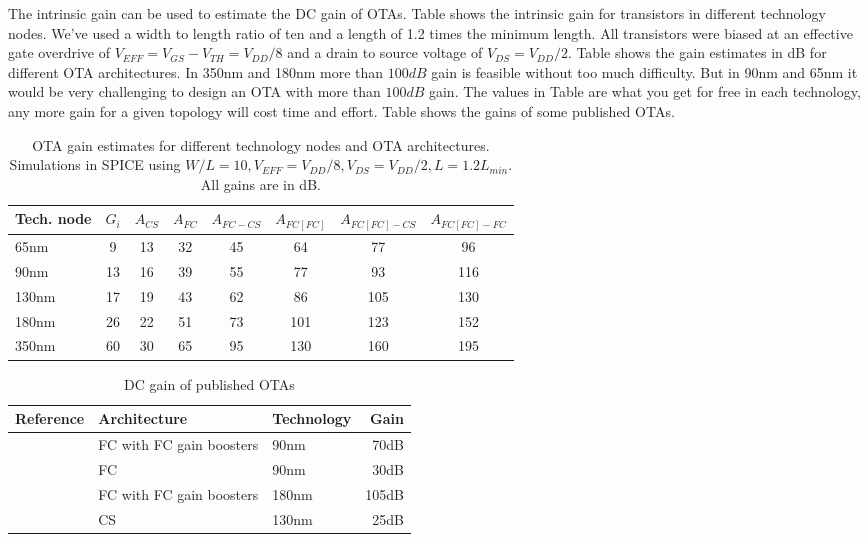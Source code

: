 The intrinsic gain can be used to estimate the DC gain of
OTAs. Table \label{tab:ingain} shows the intrinsic gain for
transistors in different technology nodes. We've used a width to
length ratio of ten and a length of 1.2 times the minimum length. All
transistors were biased at an effective gate overdrive of $V_{EFF} = V_{GS} - V_{TH} =
V_{DD}/8$ and a drain to source voltage of $V_{DS} =
V_{DD}/2$. Table \label{tab:ingain} shows the gain estimates in dB for different
OTA architectures. In 350nm and 180nm  more than $100dB$ gain is feasible without
too much difficulty. But in 90nm and 65nm it would be very challenging
to design an OTA with more than $100dB$ gain. The
values in Table \label{tab:ingain} are what you get for free in each
technology, any more gain for a given topology will cost time and
effort. Table \label{tab:realota} shows the gains of
some published OTAs.

\begin{table}[ht]
\caption{OTA gain estimates for different technology nodes and OTA architectures. Simulations in SPICE using $W/L=10, V_{EFF}=V_{DD}/8, V_{DS}
  = V_{DD}/2, L=1.2L_{min}$. All gains are in dB.}
\centering 
\begin{tabular}{ l | c | c | c | c | c | c | c }

\label{tab:ingain}
Tech. node&$G_i$&$A_{CS}$&$A_{FC}$&$A_{FC-CS}$&$A_{FC[FC]}$&$A_{FC[FC]-CS}$&$A_{FC[FC]-FC}$\\
\hline 
65nm	&9	&13     &32	&45	&64	&77	&96\\
90nm	&13	&16     &39	&55	&77	&93	&116\\
130nm	&17	&19     &43	&62	&86	&105	&130\\
180nm	&26	&22     &51	&73	&101	&123	&152\\
350nm	&60	&30     &65	&95	&130	&160	&195\\
\end{tabular}

\end{table}

\begin{table}[ht]
\caption{DC gain of published OTAs}
\centering 
\begin{tabular}{ l | l | l | r  }
\label{tab:realota}
Reference & Architecture & Technology & Gain\\
\hline 
\cite{berntsen05} & FC with FC gain boosters & 90nm & 70dB\\
\cite{berntsen05} & FC & 90nm & 30dB\\
\cite{ahmed05} & FC with FC gain boosters & 180nm & 105dB\\
\cite{hernes07} & CS & 130nm & 25dB\\
\end{tabular}
\end{table}




